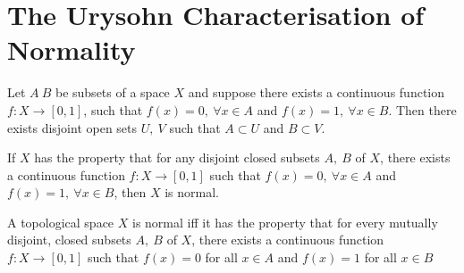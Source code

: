
\section{The Urysohn Characterisation of Normality}
\begin{proposition}
	Let $A\ B$ be subsets of a space $X$ and suppose there exists a continuous function $f:X \to [0,1]$, such that $f(x)=0,\ \forall x \in A$ and $f(x)=1,\ \forall x \in B$. Then there exists disjoint open sets $U,\ V$ such that $A \subset U$ and $B \subset V$.
\end{proposition}

\begin{corollary}
	If $X$ has the property that for any disjoint closed subsets $A,\ B$ of $X$, there exists a continuous function $f : X \to [0,1]$ such that $f(x)=0,\ \forall x \in A$ and $f(x)=1,\ \forall x \in B$, then $X$ is normal.
\end{corollary}

\begin{theorem}
	A topological space $X$ is normal iff it has the property that for every mutually disjoint, closed subsets $A,\ B$ of $X$, there exists a continuous function \( f : X \to [0,1] \) such that \( f(x) = 0 \) for all $x \in A$ and \( f(x) = 1 \) for all \( x \in B \)
\end{theorem}

